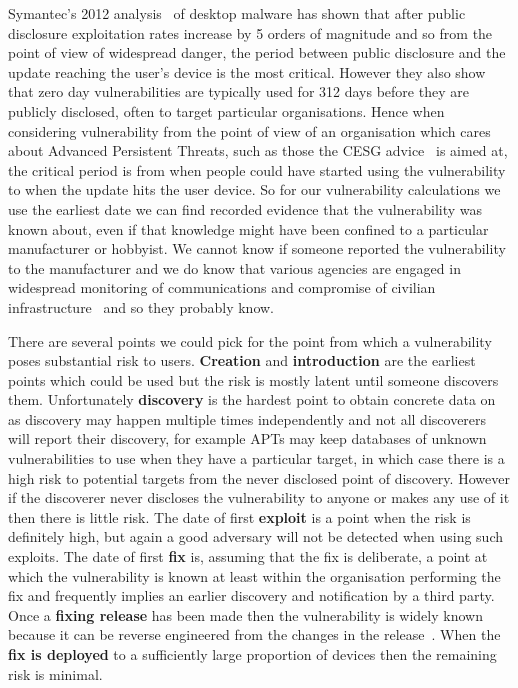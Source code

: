 \documentclass[conference,a4paper,twoside]{IEEEtran}
\begin{document}
Symantec's 2012 analysis~\cite{Bilge2012} of desktop malware has shown that after public disclosure exploitation rates increase by 5 orders of magnitude and so from the point of view of widespread danger, the period between public disclosure and the update reaching the user's device is the most critical.
However they also show that zero day vulnerabilities are typically used for 312 days before they are publicly disclosed, often to target particular organisations.
Hence when considering vulnerability from the point of view of an organisation which cares about Advanced Persistent Threats, such as those the CESG advice~\cite{CESG2013} is aimed at, the critical period is from when people could have started using the vulnerability to when the update hits the user device.
So for our vulnerability calculations we use the earliest date we can find recorded evidence that the vulnerability was known about, even if that knowledge might have been confined to a particular manufacturer or hobbyist.
We cannot know if someone reported the vulnerability to the manufacturer and we do know that various agencies are engaged in widespread monitoring of communications and compromise of civilian infrastructure~\cite{TODO} and so they probably know.

There are several points we could pick for the point from which a vulnerability poses substantial risk to users.
{\bf Creation} and {\bf introduction} are the earliest points which could be used but the risk is mostly latent until someone discovers them.
Unfortunately {\bf discovery} is the hardest point to obtain concrete data on as discovery may happen multiple times independently and not all discoverers will report their discovery, for example APTs may keep databases of unknown vulnerabilities to use when they have a particular target, in which case there is a high risk to potential targets from the never disclosed point of discovery.
However if the discoverer never discloses the vulnerability to anyone or makes any use of it then there is little risk.
The date of first {\bf exploit} is a point when the risk is definitely high, but again a good adversary will not be detected when using such exploits.
The date of first {\bf fix} is, assuming that the fix is deliberate, a point at which the vulnerability is known at least within the organisation performing the fix and frequently implies an earlier discovery and notification by a third party.
Once a {\bf fixing release} has been made then the vulnerability is widely known because it can be reverse engineered from the changes in the release~\cite{TODO}.
When the {\bf fix is deployed} to a sufficiently large proportion of devices then the remaining risk is minimal.
\end{document}
